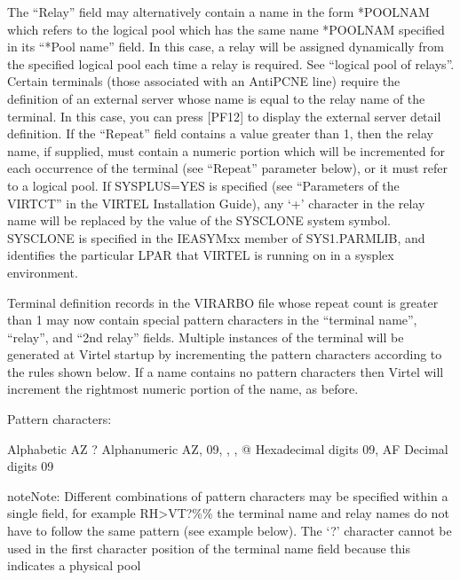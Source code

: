 \documentclass[letterpaper,10pt,english]{sphinxmanual}
\begin{document}
\begin{description}
The “Relay” field may alternatively contain a name in the form *POOLNAM which refers to the logical pool which has the same name *POOLNAM specified in its “*Pool name” field. In this case, a relay will be assigned dynamically from the specified logical pool each time a relay is required. See “logical pool of relays”. Certain terminals (those associated with an AntiPCNE line) require the definition of an external server whose name is equal to the relay name of the terminal. In this case, you can press {[}PF12{]} to display the external server detail definition. If the “Repeat” field contains a value greater than 1, then the relay name, if supplied, must contain a numeric portion which will be incremented for each occurrence of the terminal (see “Repeat” parameter below), or it must refer to a logical pool. If SYSPLUS=YES is specified (see “Parameters of the VIRTCT” in the VIRTEL Installation Guide), any ‘+’ character in the relay name will be replaced by the value of the SYSCLONE system symbol. SYSCLONE is specified in the IEASYMxx member of SYS1.PARMLIB, and identifies the particular LPAR that VIRTEL is running on in a sysplex environment.

Terminal definition records in the VIRARBO file whose repeat count is greater than 1 may now contain special pattern characters in the “terminal name”, “relay”, and “2nd relay” fields. Multiple instances of the terminal will be generated at Virtel startup by incrementing the pattern characters according to the rules shown below. If a name contains no pattern characters then Virtel will increment the rightmost numeric portion of the name, as before.

Pattern characters:

\end{description}

\begin{sphinxVerbatim}[commandchars=\\\{\}]
\PYGZgt{}  Alphabetic A\PYGZhy{}Z
?  Alphanumeric A\PYGZhy{}Z, 0\PYGZhy{}9, \PYGZdl{}, \PYGZsh{}, @
\PYGZpc{}  Hexadecimal digits 0\PYGZhy{}9, A\PYGZhy{}F
\PYGZlt{}  Decimal digits 0\PYGZhy{}9
\end{sphinxVerbatim}

\begin{sphinxadmonition}{note}{Note:}
Different combinations of pattern characters may be specified within a single field, for example RH\textgreater{}VT?\%\% the terminal name and relay names do not have to follow the same pattern (see example below). The ‘?’ character cannot be used in the first character position of the terminal name field because this indicates a physical pool
\end{sphinxadmonition}
\end{document}
